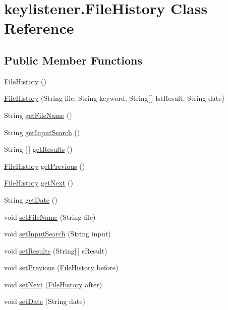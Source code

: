 \hypertarget{classkeylistener_1_1_file_history}{}\section{keylistener.\+File\+History Class Reference}
\label{classkeylistener_1_1_file_history}
\subsection*{Public Member Functions}
\begin{DoxyCompactItemize}
\item 
\hyperlink{classkeylistener_1_1_file_history_a22f91ebaebdafb0076fc7ff28c3f1993}{File\+History} ()
\item 
\hyperlink{classkeylistener_1_1_file_history_a31c068625f0fdac8966c4ce76bde8a86}{File\+History} (String file, String keyword, String\mbox{[}$\,$\mbox{]} lst\+Result, String date)
\item 
String \hyperlink{classkeylistener_1_1_file_history_a3566b314572e386b54c140ab4936590b}{get\+File\+Name} ()
\item 
String \hyperlink{classkeylistener_1_1_file_history_a33c2c0514f7fc3614f428504dd74276d}{get\+Input\+Search} ()
\item 
String \mbox{[}$\,$\mbox{]} \hyperlink{classkeylistener_1_1_file_history_a25a150f439e4577a25b29fbf9f86f9b7}{get\+Results} ()
\item 
\hyperlink{classkeylistener_1_1_file_history}{File\+History} \hyperlink{classkeylistener_1_1_file_history_ae89875744c0f07e59f8e2087c985901c}{get\+Previous} ()
\item 
\hyperlink{classkeylistener_1_1_file_history}{File\+History} \hyperlink{classkeylistener_1_1_file_history_a6a27d9d0c37dd7cc422bd6bd6ca709be}{get\+Next} ()
\item 
String \hyperlink{classkeylistener_1_1_file_history_a72fefe056f783ec704374f9c14dda0a5}{get\+Date} ()
\item 
void \hyperlink{classkeylistener_1_1_file_history_a721185583f76cb336eb489e0124a8be8}{set\+File\+Name} (String file)
\item 
void \hyperlink{classkeylistener_1_1_file_history_acaf8a8e1dc879a8ef64e0940ab791bc7}{set\+Input\+Search} (String input)
\item 
void \hyperlink{classkeylistener_1_1_file_history_a7e8911bcdd6a7483ba7e317692af39c9}{set\+Results} (String\mbox{[}$\,$\mbox{]} s\+Result)
\item 
void \hyperlink{classkeylistener_1_1_file_history_ab3c4c436053b547e327b04b812a9870c}{set\+Previous} (\hyperlink{classkeylistener_1_1_file_history}{File\+History} before)
\item 
void \hyperlink{classkeylistener_1_1_file_history_a8e5dff723fb93991057375f579486eae}{set\+Next} (\hyperlink{classkeylistener_1_1_file_history}{File\+History} after)
\item 
void \hyperlink{classkeylistener_1_1_file_history_a1de701cd56aac77075457d16c411be74}{set\+Date} (String date)
\end{DoxyCompactItemize}
